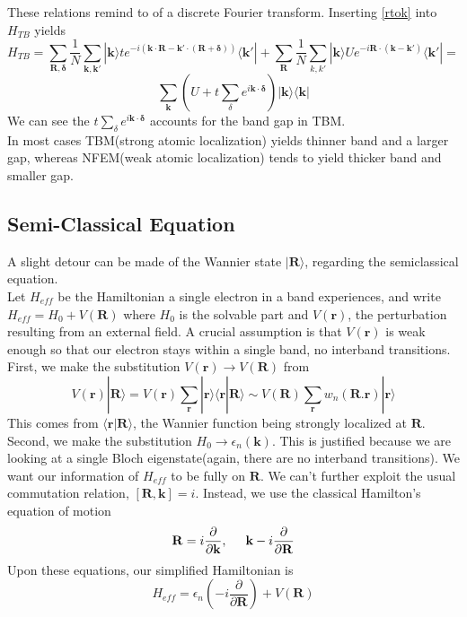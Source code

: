 \documentclass{article}
\begin{document}
These relations remind to of a discrete Fourier transform. Inserting \eqref{rtok} into $H_{TB}$ yields
$$H_{TB}=\sum_{\mathbf{R,\delta}}\frac{1}{N}\sum_{\mathbf{k,k'}}|\mathbf{k}\rangle te^{-i(\mathbf{k}\cdot\mathbf{R}-\mathbf{k'}\cdot(\mathbf{R+\delta}))}\langle\mathbf{k'}|+\sum_{\mathbf{R}}\frac{1}{N}\sum_{k,k'}|\mathbf{k}\rangle Ue^{-i\mathbf{R}\cdot(\mathbf{k-k'})}\langle\mathbf{k'}|=$$
$$\sum_{\mathbf{k}}\left(U+t\sum_{\delta}e^{i\mathbf{k}\cdot\mathbf{\delta}}\right)|\mathbf{k}\rangle\langle\mathbf{k}|$$
We can see the $t\sum_{\delta}e^{i\mathbf{k}\cdot\mathbf{\delta}}$ accounts for the band gap in TBM.\\
In most cases TBM(strong atomic localization) yields thinner band and a larger gap, whereas NFEM(weak atomic localization) tends to yield thicker band and smaller gap.
\subsection*{Semi-Classical Equation}
A slight detour can be made of the Wannier state $|\mathbf{R}\rangle$, regarding the semiclassical equation.\\
Let $H_{eff}$ be the Hamiltonian a single electron in a band experiences, and write $H_{eff}=H_0+V(\mathbf{R})$ where $H_0$ is the solvable part and $V(\mathbf{r})$, the perturbation resulting from an external field. A crucial assumption is that $V(\mathbf{r})$ is weak enough so that our electron stays within a single band, no interband transitions. \\
First, we make the substitution $V(\mathbf{r})\to V(\mathbf{R})$ from
$$V(\mathbf{r})|\mathbf{R}\rangle=V(\mathbf{r})\sum_{\mathbf{r}}|\mathbf{r}\rangle\langle\mathbf{r}|\mathbf{R}\rangle\sim V(\mathbf{R})\sum_{\mathbf{r}}w_n(\mathbf{R.r})|\mathbf{r}\rangle$$
This comes from $\langle\mathbf{r}|\mathbf{R}\rangle$, the Wannier function being strongly localized at $\mathbf{R}$.\\
Second, we make the substitution $H_0\to\epsilon_n(\mathbf{k})$. This is justified because we are looking at a single Bloch eigenstate(again, there are no interband transitions). We want our information of $H_{eff}$ to be fully on $\mathbf{R}$. We can't further exploit the usual commutation relation, $[\mathbf{R},\mathbf{k}]=i$. Instead, we use the classical Hamilton's equation of motion
$$\mathbf{R}=i\frac{\partial}{\partial\mathbf{k}},\hspace{5mm}\mathbf{k}-i\frac{\partial}{\partial \mathbf{R}}$$
Upon these equations, our simplified Hamiltonian is
$$H_{eff}=\epsilon_n\left(-i\frac{\partial}{\partial\mathbf{R}}\right)+V(\mathbf{R})$$
\end{document}
